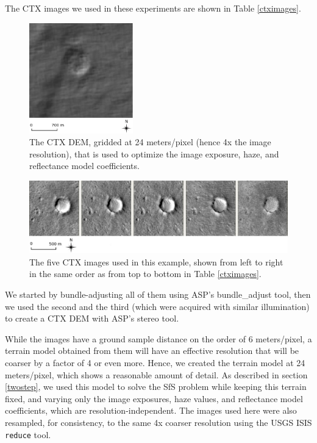 \documentclass[draft,linenumbers]{agujournal}
\begin{document}
The CTX images we used in these experiments are shown in Table \ref{ctximages}.

\begin{figure}[h!]
\centering
\includegraphics[width=0.4\textwidth]{hires_dem.jpg}
\caption[sfs]{The CTX DEM, gridded at 24 meters/pixel (hence 4x the image resolution), that is used to optimize the image exposure, haze, and reflectance model coefficients.}
\label{hires}
\end{figure}

\begin{figure}[h!]
\centering
\includegraphics[width=\textwidth]{sfs_mars_fig1}
\caption[sfs]{The five CTX images used in this example, shown from left to right in the same order as from top to bottom in Table \ref{ctximages}.}
\label{sfs1}
\end{figure}

We started by bundle-adjusting all of them using ASP's bundle\_adjust tool, then we used the second and the third (which were acquired with similar illumination) to create a CTX DEM with ASP's stereo tool. 

While the images have a ground sample distance on the order of 6 meters/pixel, a terrain model obtained from them will have an effective resolution that will be coarser by a factor of 4 or even more. Hence, we created the terrain model at 24 meters/pixel, which shows a reasonable amount of detail. 
As described in section \ref{twostep}, we used this model to solve the SfS problem while keeping this terrain fixed, and varying only the image exposures, haze values, and reflectance model coefficients, which are resolution-independent. The images used here were also resampled, for consistency, to the same 4x coarser resolution using the USGS ISIS \texttt{reduce} tool.  
\end{document}
